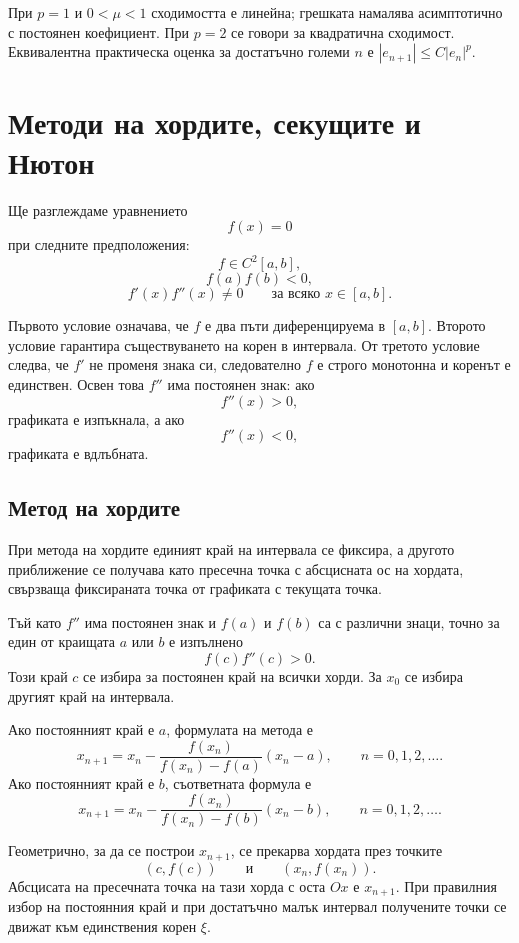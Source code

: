 При $p=1$ и $0<\mu<1$ сходимостта е линейна; грешката намалява асимптотично с постоянен коефициент. При $p=2$ се говори за квадратична сходимост. Еквивалентна практическа оценка за достатъчно големи $n$ е $|e_{n+1}|\leq C|e_n|^p$.

\section{Методи на хордите, секущите и Нютон}\label{s:34.4}

Ще разглеждаме уравнението
\[
f(x)=0
\]
при следните предположения:
\[
f\in C^2[a,b],
\]
\[
f(a)f(b)<0,
\]
\[
f'(x)f''(x)\neq0
\qquad \text{за всяко }x\in[a,b].
\]

Първото условие означава, че $f$ е два пъти диференцируема в $[a,b]$. Второто условие гарантира съществуването на корен в интервала. От третото условие следва, че $f'$ не променя знака си, следователно $f$ е строго монотонна и коренът е единствен. Освен това $f''$ има постоянен знак: ако
\[
f''(x)>0,
\]
графиката е изпъкнала, а ако
\[
f''(x)<0,
\]
графиката е вдлъбната.

\subsection{Метод на хордите}\label{s:34.4.1}

При метода на хордите единият край на интервала се фиксира, а другото приближение се получава като пресечна точка с абсцисната ос на хордата, свързваща фиксираната точка от графиката с текущата точка.

Тъй като $f''$ има постоянен знак и $f(a)$ и $f(b)$ са с различни знаци, точно за един от краищата $a$ или $b$ е изпълнено
\[
f(c)f''(c)>0.
\]
Този край $c$ се избира за постоянен край на всички хорди. За $x_0$ се избира другият край на интервала.

Ако постоянният край е $a$, формулата на метода е
\[
x_{n+1}
=
x_n-
\frac{f(x_n)}{f(x_n)-f(a)}(x_n-a),
\qquad n=0,1,2,\ldots.
\]
Ако постоянният край е $b$, съответната формула е
\[
x_{n+1}
=
x_n-
\frac{f(x_n)}{f(x_n)-f(b)}(x_n-b),
\qquad n=0,1,2,\ldots.
\]

Геометрично, за да се построи $x_{n+1}$, се прекарва хордата през точките
\[
(c,f(c))
\qquad \text{и} \qquad
(x_n,f(x_n)).
\]
Абсцисата на пресечната точка на тази хорда с оста $Ox$ е $x_{n+1}$. При правилния избор на постоянния край и при достатъчно малък интервал получените точки се движат към единствения корен $\xi$.


